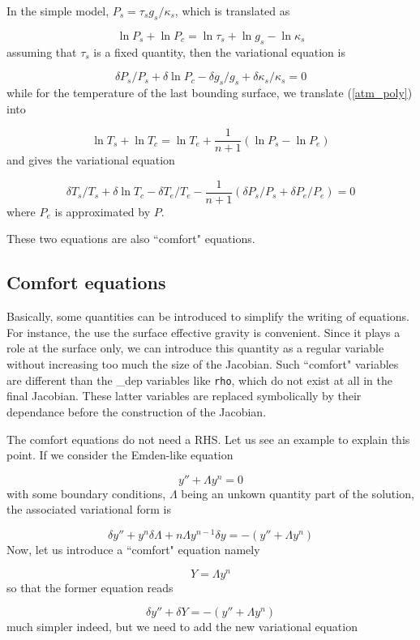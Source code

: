 In the simple model, $P_s=\tau_sg_s/\kappa_s$, which is translated as

\[ \ln P_s+\ln P_c = \ln\tau_s +\ln g_s -\ln\kappa_s\]
assuming that $\tau_s$ is a fixed quantity, then the variational equation is 

\begin{equation}
\delta P_s/P_s + \delta\ln P_c - \delta g_s/g_s +\delta\kappa_s/\kappa_s = 0
\end{equation}
while for the temperature of the last bounding surface, we translate
(\ref{atm_poly}) into

\[ \ln T_s + \ln T_c = \ln T_e + \frac{1}{n+1}(\ln P_s - \ln P_e)\]
and gives the variational equation

\begin{equation}
\delta T_s/T_s + \delta\ln T_c -\delta T_e/T_e -\frac{1}{n+1}(\delta
P_s/P_s+\delta P_e/P_e) = 0
\end{equation}
where $P_e$ is approximated by $P$.

These two equations are also ``comfort" equations.

\subsection{Comfort equations}\label{comf_eq}

Basically, some quantities can be introduced to simplify the writing of
equations. For instance, the use the surface effective gravity is convenient.
Since it plays a role at the surface only, we can introduce this
quantity as a regular variable without increasing too much the size of the
Jacobian. Such ``comfort" variables are different than the \_dep variables
like {\tt rho}, which do not exist at all in the final Jacobian. These
latter variables are replaced symbolically by their dependance before
the construction of the Jacobian.

The comfort equations do not need a RHS. Let us see an example to explain
this point. If we consider the Emden-like equation

\[ y''+\Lambda y^n = 0\]
with some boundary conditions, $\Lambda$ being an unkown quantity part
of the solution, the associated variational form is

\[ \delta y'' + y^n\delta\Lambda + n\Lambda y^{n-1}\delta y = -(y''+\Lambda y^n)\]
Now, let us introduce a ``comfort" equation namely

\[ Y=\Lambda y^n\]
so that the former equation reads

\[ \delta y'' + \delta Y = -(y''+\Lambda y^n)\]
much simpler indeed, but we need to add the new variational equation

